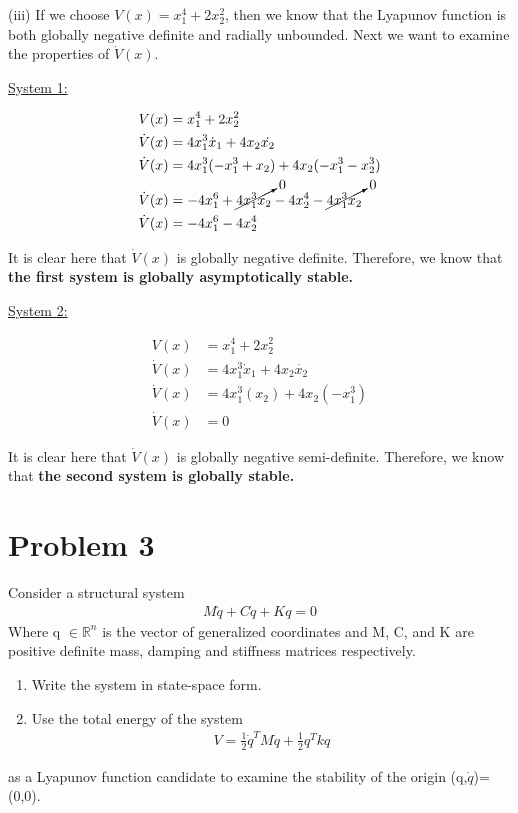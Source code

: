 \documentclass{article}
\begin{document}
  (iii) If we choose $V(x)=x_1^4 + 2x_2^2$, then we know that the Lyapunov
  function is both globally negative definite and radially unbounded. Next we want to examine the
  properties of $\dot{V}(x)$.

  \underline{System 1:}

  \begin{align*}
    V(x) &= x_1^4 + 2x_2^2 \\
    \dot{V}(x) &= 4x_1^3\dot{x}_1 + 4x_2\dot{x_2} \\
    \dot{V}(x) &= 4x_1^3(-x_1^3 + x_2) + 4x_2(-x_1^3 - x_2^3) \\
    \dot{V}(x) &= -4x_1^6 + \cancelto{0}{4x_1^3x_2} - 4x_2^4 - \cancelto{0}{4x_1^3x_2} \\
    \dot{V}(x) &= -4x_1^6 - 4x_2^4
  \end{align*}

  It is clear here that $\dot{V}(x)$ is globally negative definite. Therefore, we know that \textbf{the first
  system is globally asymptotically stable.} \newline
  
  \underline{System 2:}

  \begin{align*}
    V(x) &= x_1^4 + 2x_2^2 \\
    \dot{V}(x) &= 4x_1^3\dot{x}_1 + 4x_2\dot{x_2} \\
    \dot{V}(x) &= 4x_1^3(x_2) + 4x_2(-x_1^3) \\
    \dot{V}(x) &= 0
  \end{align*}

  It is clear here that $\dot{V}(x)$ is globally negative semi-definite. Therefore, we know that
  \textbf{the second system is globally stable.}
  
  \newpage 


  \section{Problem 3} 

  Consider a structural system
  \begin{align*}
    M\ddot{q} + C\dot{q} + Kq = 0
  \end{align*}
  Where q $\in \mathbb{R}^n$ is the vector of generalized coordinates and M, C, and
K are positive definite mass, damping and stiffness matrices respectively. 
  \begin{enumerate}[label=(\roman*)]
    \item Write the system in state-space form.
    \item Use the total energy of the system
    \begin{align*}
      V = \frac{1}{2}\dot{q}^TM\dot{q} + \frac{1}{2}q^Tkq
    \end{align*}
  \end{enumerate}
  as a Lyapunov function candidate to examine the stability of the origin
  (q,$\dot{q}$)=(0,0). \newline \newline
\end{document}
